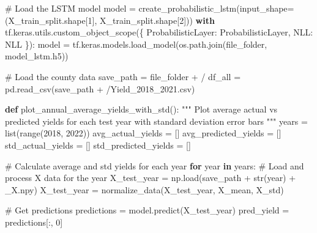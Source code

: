 \documentclass[
  letterpaper,
  DIV=11,
  numbers=noendperiod]{scrreprt}
\newenvironment{Shaded}{\begin{snugshade}}{\end{snugshade}}
\newcommand{\BuiltInTok}[1]{\textcolor[rgb]{0.00,0.23,0.31}{#1}}
\newcommand{\CommentTok}[1]{\textcolor[rgb]{0.37,0.37,0.37}{#1}}
\newcommand{\ControlFlowTok}[1]{\textcolor[rgb]{0.00,0.23,0.31}{\textbf{#1}}}
\newcommand{\DecValTok}[1]{\textcolor[rgb]{0.68,0.00,0.00}{#1}}
\newcommand{\KeywordTok}[1]{\textcolor[rgb]{0.00,0.23,0.31}{\textbf{#1}}}
\newcommand{\NormalTok}[1]{\textcolor[rgb]{0.00,0.23,0.31}{#1}}
\newcommand{\OperatorTok}[1]{\textcolor[rgb]{0.37,0.37,0.37}{#1}}
\newcommand{\StringTok}[1]{\textcolor[rgb]{0.13,0.47,0.30}{#1}}
\begin{document}
\begin{Shaded}
\begin{Highlighting}[]
\CommentTok{\# Load the LSTM model}
\NormalTok{model }\OperatorTok{=}\NormalTok{ create\_probabilistic\_lstm(input\_shape}\OperatorTok{=}\NormalTok{(X\_train\_split.shape[}\DecValTok{1}\NormalTok{], X\_train\_split.shape[}\DecValTok{2}\NormalTok{]))}
\ControlFlowTok{with}\NormalTok{ tf.keras.utils.custom\_object\_scope(\{}
    \StringTok{\textquotesingle{}ProbabilisticLayer\textquotesingle{}}\NormalTok{: ProbabilisticLayer,}
    \StringTok{\textquotesingle{}NLL\textquotesingle{}}\NormalTok{: NLL}
\NormalTok{\}):}
\NormalTok{    model }\OperatorTok{=}\NormalTok{ tf.keras.models.load\_model(os.path.join(file\_folder, }\StringTok{\textquotesingle{}model\_lstm.h5\textquotesingle{}}\NormalTok{))}

\CommentTok{\# Load the county data}
\NormalTok{save\_path }\OperatorTok{=}\NormalTok{ file\_folder }\OperatorTok{+} \StringTok{\textquotesingle{}/\textquotesingle{}}
\NormalTok{df\_all }\OperatorTok{=}\NormalTok{ pd.read\_csv(save\_path }\OperatorTok{+} \StringTok{\textquotesingle{}/Yield\_2018\_2021.csv\textquotesingle{}}\NormalTok{)}

\KeywordTok{def}\NormalTok{ plot\_annual\_average\_yields\_with\_std():}
    \CommentTok{"""}
\CommentTok{    Plot average actual vs predicted yields for each test year with standard deviation error bars}
\CommentTok{    """}
\NormalTok{    years }\OperatorTok{=} \BuiltInTok{list}\NormalTok{(}\BuiltInTok{range}\NormalTok{(}\DecValTok{2018}\NormalTok{, }\DecValTok{2022}\NormalTok{))}
\NormalTok{    avg\_actual\_yields }\OperatorTok{=}\NormalTok{ []}
\NormalTok{    avg\_predicted\_yields }\OperatorTok{=}\NormalTok{ []}
\NormalTok{    std\_actual\_yields }\OperatorTok{=}\NormalTok{ []}
\NormalTok{    std\_predicted\_yields }\OperatorTok{=}\NormalTok{ []}

    \CommentTok{\# Calculate average and std yields for each year}
    \ControlFlowTok{for}\NormalTok{ year }\KeywordTok{in}\NormalTok{ years:}
        \CommentTok{\# Load and process X data for the year}
\NormalTok{        X\_test\_year }\OperatorTok{=}\NormalTok{ np.load(save\_path }\OperatorTok{+} \BuiltInTok{str}\NormalTok{(year) }\OperatorTok{+} \StringTok{\textquotesingle{}\_X.npy\textquotesingle{}}\NormalTok{)}
\NormalTok{        X\_test\_year }\OperatorTok{=}\NormalTok{ normalize\_data(X\_test\_year, X\_mean, X\_std)}

        \CommentTok{\# Get predictions}
\NormalTok{        predictions }\OperatorTok{=}\NormalTok{ model.predict(X\_test\_year)}
\NormalTok{        pred\_yield }\OperatorTok{=}\NormalTok{ predictions[:, }\DecValTok{0}\NormalTok{]}


\end{Highlighting}
\end{Shaded}
\end{document}
